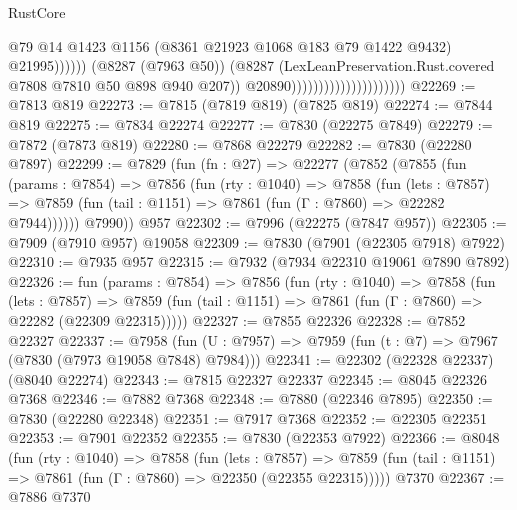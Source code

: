 \begin{lexlean}{RustCore}
\begin{coremodule}
                                                          @79
                                                          @14
                                                          @1423
                                                          @1156
                                                          (@8361 @21923 @1068 @183 @79 @1422 @9432)
                                                          @21995))))))
                                              (@8287 (@7963 @50))
                                              (@8287
                                                (LexLeanPreservation.Rust.covered
                                                  @7808
                                                  @7810
                                                  @50
                                                  @898
                                                  @940
                                                  @207))
                                              @20890)))))))))))))))))))))
@22269 := @7813 @819
@22273 := @7815 (@7819 @819) (@7825 @819)
@22274 := @7844 @819
@22275 := @7834 @22274
@22277 := @7830 (@22275 @7849)
@22279 := @7872 (@7873 @819)
@22280 := @7868 @22279
@22282 := @7830 (@22280 @7897)
@22299 := @7829
    (fun (fn : @27) =>
    @22277
      (@7852
        (@7855
          (fun (params : @7854) =>
          @7856
            (fun (rty : @1040) =>
            @7858
              (fun (lets : @7857) =>
              @7859 (fun (tail : @1151) => @7861 (fun (Γ : @7860) => @22282 @7944))))))
        @7990))
    @957
@22302 := @7996 (@22275 (@7847 @957))
@22305 := @7909 (@7910 @957) @19058
@22309 := @7830 (@7901 (@22305 @7918) @7922)
@22310 := @7935 @957
@22315 := @7932 (@7934 @22310 @19061 @7890 @7892)
@22326 := fun (params : @7854) =>
  @7856
    (fun (rty : @1040) =>
    @7858
      (fun (lets : @7857) =>
      @7859 (fun (tail : @1151) => @7861 (fun (Γ : @7860) => @22282 (@22309 @22315)))))
@22327 := @7855 @22326
@22328 := @7852 @22327
@22337 := @7958
    (fun (U : @7957) => @7959 (fun (t : @7) => @7967 (@7830 (@7973 @19058 @7848) @7984)))
@22341 := @22302 (@22328 @22337) (@8040 @22274)
@22343 := @7815 @22327 @22337
@22345 := @8045 @22326 @7368
@22346 := @7882 @7368
@22348 := @7880 (@22346 @7895)
@22350 := @7830 (@22280 @22348)
@22351 := @7917 @7368
@22352 := @22305 @22351
@22353 := @7901 @22352
@22355 := @7830 (@22353 @7922)
@22366 := @8048
    (fun (rty : @1040) =>
    @7858
      (fun (lets : @7857) =>
      @7859 (fun (tail : @1151) => @7861 (fun (Γ : @7860) => @22350 (@22355 @22315)))))
    @7370
@22367 := @7886 @7370

\end{coremodule}
\end{lexlean}
